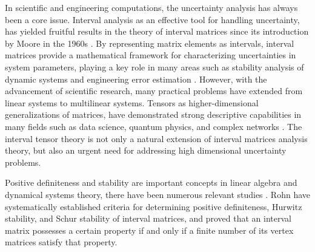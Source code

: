 \documentclass[twoside]{article}
\begin{document}
In scientific and engineering computations, the uncertainty analysis has always been a core issue. Interval analysis as an effective tool for handling uncertainty, has yielded fruitful results in the theory of interval matrices since its introduction by Moore in the 1960s \cite{a1,a2,a3,a4,a5,a6}. By representing matrix elements as intervals, interval matrices provide a mathematical framework for characterizing uncertainties in system parameters, playing a key role in many areas such as stability analysis of dynamic systems and engineering error estimation \cite{b1,b2,b3,b4}. However, with the advancement of scientific research, many practical problems have extended from linear systems to multilinear systems. Tensors as higher-dimensional generalizations of matrices, have demonstrated strong descriptive capabilities in many fields such as data science, quantum physics, and complex networks \cite{c1,c2,c3,c4,c5,c6,c7,c8,c9,c10,c11}. The interval tensor theory is not only a natural extension of interval matrices analysis theory, but also an urgent need for addressing high dimensional uncertainty problems.

Positive definiteness and stability are important concepts in linear algebra and dynamical systems theory, there have been numerous relevant studies \cite{d1,d2,d3,d4,d5,rohn1994}. %
Rohn \cite{rohn1994} have systematically established criteria for determining positive definiteness, Hurwitz stability, and Schur stability of interval matrices, and proved that an interval matrix possesses a certain property if and only if a finite number of its vertex matrices satisfy that property.
\end{document}
